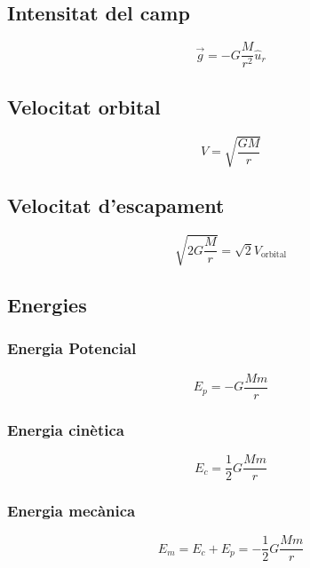 \vspace{1cm}

\begin{multicols}{2}

    \subsection{Intensitat del camp}
    \label{sub:intensitat_del_camp}

    \begin{equation}
        \vec{g} = -G \frac{M}{r^2} \hat{u}_r
    \end{equation}

    \subsection{Velocitat orbital}
    \label{sub:velocitat_orbital}

    \begin{equation}
        V = \sqrt{\frac{GM}{r}}
    \end{equation}

    \subsection{Velocitat d'escapament}
    \label{sub:velocitat_d_escapament}

    \begin{equation}
        \sqrt{2G\frac{M}{r}} = \sqrt{2}V_\text{orbital}
    \end{equation}

\end{multicols}

\subsection{Energies}
\label{sub:energies}

\begin{multicols}{2}
    \subsubsection{Energia Potencial}
    \label{ssub:energia_potencial}
    \begin{equation}
        E_p = -G \frac{Mm}{r}
    \end{equation}

    \subsubsection{Energia cinètica}
    \label{ssub:energia_cinetica}
    \begin{equation}
        E_c = \frac{1}{2} G\frac{Mm}{r}
    \end{equation}

    \subsubsection{Energia mecànica}
    \label{ssub:energia_mecanica}
    \begin{equation}
        E_m = E_c + E_p = -\frac{1}{2} G \frac{Mm}{r}
    \end{equation}
\end{multicols}

